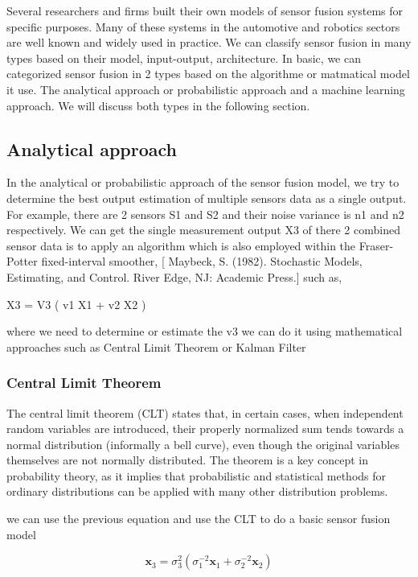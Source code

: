 Several researchers and firms built their own models of sensor fusion systems for specific purposes. Many of these systems in the automotive and robotics sectors are well known and widely used in practice. We can classify sensor fusion in many types based on their model, input-output, architecture. In basic, we can categorized sensor fusion in 2 types based on the algorithme or matmatical model it use. The analytical approach or probabilistic approach and a machine learning approach. We will discuss both types in the following section.



\subsection{Analytical approach}

In the analytical or probabilistic approach of the sensor fusion model, we try to determine the best output estimation of multiple sensors data as a single output. For example, there are 2 sensors S1 and S2 and their noise variance is n1 and n2 respectively.
We can get the single measurement output X3 of there 2 combined sensor data is to apply an algorithm which is also employed within the Fraser-Potter fixed-interval smoother, [ Maybeck, S. (1982). Stochastic Models, Estimating, and Control. River Edge, NJ: Academic Press.] such as,

X3 = V3 ( v1 X1 + v2 X2    )

where we need to determine or estimate the v3
we can do it using mathematical approaches such as Central Limit Theorem or Kalman Filter


\subsubsection{Central Limit Theorem}

The central limit theorem (CLT) states that, in certain cases, when independent random variables are introduced, their properly normalized sum tends towards a normal distribution (informally a bell curve), even though the original variables themselves are not normally distributed. The theorem is a key concept in probability theory, as it implies that probabilistic and statistical methods for ordinary distributions can be applied with many other distribution problems.

we can use the previous equation and use the CLT to do a basic sensor fusion model


\begin{equation}\mathbf{x}_{3}=\sigma_{3}^{2}\left(\sigma_{1}^{-2} \mathbf{x}_{1}+\sigma_{2}^{-2} \mathbf{x}_{2}\right)\end{equation}


